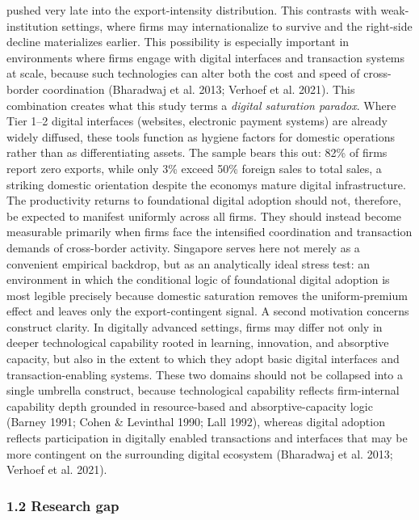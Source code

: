 \documentclass[12pt,a4paper]{article}
\begin{document}
pushed very late into the export-intensity distribution. This contrasts
with weak-institution settings, where firms may internationalize to
survive and the right-side decline materializes earlier. This
possibility is especially important in environments where firms engage
with digital interfaces and transaction systems at scale, because such
technologies can alter both the cost and speed of cross-border
coordination (Bharadwaj et al. 2013; Verhoef et al. 2021). This
combination creates what this study terms a \emph{digital saturation
paradox}. Where Tier 1--2 digital interfaces (websites, electronic
payment systems) are already widely diffused, these tools function as
hygiene factors for domestic operations rather than as differentiating
assets. The sample bears this out: 82\% of firms report zero exports,
while only 3\% exceed 50\% foreign sales to total sales, a striking
domestic orientation despite the economy\textquotesingle s mature
digital infrastructure. The productivity returns to foundational digital
adoption should not, therefore, be expected to manifest uniformly across
all firms. They should instead become measurable primarily when firms
face the intensified coordination and transaction demands of
cross-border activity. Singapore serves here not merely as a convenient
empirical backdrop, but as an analytically ideal stress test: an
environment in which the conditional logic of foundational digital
adoption is most legible precisely because domestic saturation removes
the uniform-premium effect and leaves only the export-contingent signal.
A second motivation concerns construct clarity. In digitally advanced
settings, firms may differ not only in deeper technological capability
rooted in learning, innovation, and absorptive capacity, but also in the
extent to which they adopt basic digital interfaces and
transaction-enabling systems. These two domains should not be collapsed
into a single umbrella construct, because technological capability
reflects firm-internal capability depth grounded in resource-based and
absorptive-capacity logic (Barney 1991; Cohen \& Levinthal 1990; Lall
1992), whereas digital adoption reflects participation in digitally
enabled transactions and interfaces that may be more contingent on the
surrounding digital ecosystem (Bharadwaj et al. 2013; Verhoef et al.
2021).

\hypertarget{12-research-gap}{%
\subsubsection{1.2 Research gap}\label{12-research-gap}}
\end{document}
